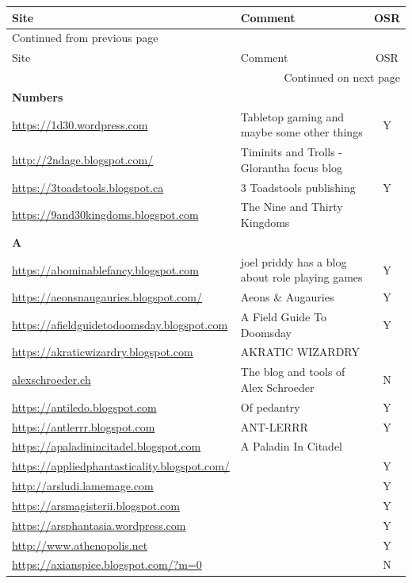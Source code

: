 \documentclass[a4paper, 11pt, twoside]{article}
\begin{document}
\begin{longtable}{p{6cm}p{8cm}c}
Site & Comment & OSR\\
\hline
\endfirsthead
\multicolumn{3}{l}{Continued from previous page} \\
\hline

Site & Comment & OSR \\

\hline
\endhead
\hline\multicolumn{3}{r}{Continued on next page} \\
\endfoot
\endlastfoot
\hline
\textbf{Numbers} &  & \\
\url{https://1d30.wordpress.com} & Tabletop gaming and maybe some other things & Y\\
\url{http://2ndage.blogspot.com/} & Timinits and Trolls - Glorantha focus blog & \\
\url{https://3toadstools.blogspot.ca} & 3 Toadstools publishing & Y\\
\url{https://9and30kingdoms.blogspot.com} & The Nine and Thirty Kingdoms & \\
\textbf{A} &  & \\
\url{https://abominablefancy.blogspot.com} & joel priddy has a blog about role playing games & Y\\
\url{https://aeonsnaugauries.blogspot.com/} & Aeons \& Augauries & Y\\
\url{https://afieldguidetodoomsday.blogspot.com} & A Field Guide To Doomsday & Y\\
\url{https://akraticwizardry.blogspot.com} & AKRATIC WIZARDRY & \\
\href{https://alexschroeder.ch/wiki/RPG}{alexschroeder.ch} & The blog and tools of Alex Schroeder & N\\
\url{https://antiledo.blogspot.com} & Of pedantry & Y\\
\url{https://antlerrr.blogspot.com} & ANT-LERRR & Y\\
\url{https://apaladinincitadel.blogspot.com} & A Paladin In Citadel & \\
\url{https://appliedphantasticality.blogspot.com/} &  & Y\\
\url{http://arsludi.lamemage.com} &  & Y\\
\url{https://arsmagisterii.blogspot.com} &  & Y\\
\url{https://arsphantasia.wordpress.com} &  & Y\\
\url{http://www.athenopolis.net} &  & Y\\
\url{https://axianspice.blogspot.com/?m=0} &  & N\\

\end{longtable}
\end{document}
